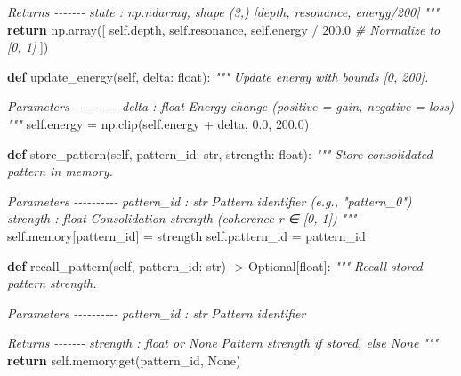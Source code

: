 \documentclass[
]{article}
\newenvironment{Shaded}{}{}
\newcommand{\BuiltInTok}[1]{\textcolor[rgb]{0.00,0.50,0.00}{#1}}
\newcommand{\CommentTok}[1]{\textcolor[rgb]{0.38,0.63,0.69}{\textit{#1}}}
\newcommand{\ControlFlowTok}[1]{\textcolor[rgb]{0.00,0.44,0.13}{\textbf{#1}}}
\newcommand{\FloatTok}[1]{\textcolor[rgb]{0.25,0.63,0.44}{#1}}
\newcommand{\KeywordTok}[1]{\textcolor[rgb]{0.00,0.44,0.13}{\textbf{#1}}}
\newcommand{\NormalTok}[1]{#1}
\newcommand{\OperatorTok}[1]{\textcolor[rgb]{0.40,0.40,0.40}{#1}}
\newcommand{\VariableTok}[1]{\textcolor[rgb]{0.10,0.09,0.49}{#1}}
\begin{document}
\begin{Shaded}
\begin{Highlighting}[]
\CommentTok{        Returns}
\CommentTok{        {-}{-}{-}{-}{-}{-}{-}}
\CommentTok{        state : np.ndarray, shape (3,)}
\CommentTok{            [depth, resonance, energy/200]}
\CommentTok{        """}
        \ControlFlowTok{return}\NormalTok{ np.array([}
            \VariableTok{self}\NormalTok{.depth,}
            \VariableTok{self}\NormalTok{.resonance,}
            \VariableTok{self}\NormalTok{.energy }\OperatorTok{/} \FloatTok{200.0}  \CommentTok{\# Normalize to [0, 1]}
\NormalTok{        ])}

    \KeywordTok{def}\NormalTok{ update\_energy(}\VariableTok{self}\NormalTok{, delta: }\BuiltInTok{float}\NormalTok{):}
        \CommentTok{"""}
\CommentTok{        Update energy with bounds [0, 200].}

\CommentTok{        Parameters}
\CommentTok{        {-}{-}{-}{-}{-}{-}{-}{-}{-}{-}}
\CommentTok{        delta : float}
\CommentTok{            Energy change (positive = gain, negative = loss)}
\CommentTok{        """}
        \VariableTok{self}\NormalTok{.energy }\OperatorTok{=}\NormalTok{ np.clip(}\VariableTok{self}\NormalTok{.energy }\OperatorTok{+}\NormalTok{ delta, }\FloatTok{0.0}\NormalTok{, }\FloatTok{200.0}\NormalTok{)}

    \KeywordTok{def}\NormalTok{ store\_pattern(}\VariableTok{self}\NormalTok{, pattern\_id: }\BuiltInTok{str}\NormalTok{, strength: }\BuiltInTok{float}\NormalTok{):}
        \CommentTok{"""}
\CommentTok{        Store consolidated pattern in memory.}

\CommentTok{        Parameters}
\CommentTok{        {-}{-}{-}{-}{-}{-}{-}{-}{-}{-}}
\CommentTok{        pattern\_id : str}
\CommentTok{            Pattern identifier (e.g., "pattern\_0")}
\CommentTok{        strength : float}
\CommentTok{            Consolidation strength (coherence r ∈ [0, 1])}
\CommentTok{        """}
        \VariableTok{self}\NormalTok{.memory[pattern\_id] }\OperatorTok{=}\NormalTok{ strength}
        \VariableTok{self}\NormalTok{.pattern\_id }\OperatorTok{=}\NormalTok{ pattern\_id}

    \KeywordTok{def}\NormalTok{ recall\_pattern(}\VariableTok{self}\NormalTok{, pattern\_id: }\BuiltInTok{str}\NormalTok{) }\OperatorTok{{-}\textgreater{}}\NormalTok{ Optional[}\BuiltInTok{float}\NormalTok{]:}
        \CommentTok{"""}
\CommentTok{        Recall stored pattern strength.}

\CommentTok{        Parameters}
\CommentTok{        {-}{-}{-}{-}{-}{-}{-}{-}{-}{-}}
\CommentTok{        pattern\_id : str}
\CommentTok{            Pattern identifier}

\CommentTok{        Returns}
\CommentTok{        {-}{-}{-}{-}{-}{-}{-}}
\CommentTok{        strength : float or None}
\CommentTok{            Pattern strength if stored, else None}
\CommentTok{        """}
        \ControlFlowTok{return} \VariableTok{self}\NormalTok{.memory.get(pattern\_id, }\VariableTok{None}\NormalTok{)}
\end{Highlighting}
\end{Shaded}
\end{document}
